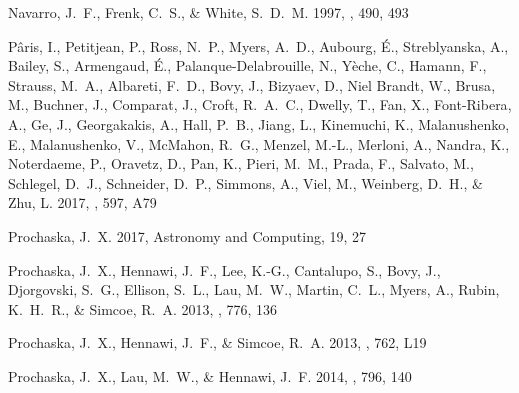 \documentclass[iop]{emulateapj}
\begin{document}
\begin{thebibliography}{61}
{Navarro}, J.~F., {Frenk}, C.~S., \& {White}, S.~D.~M. 1997, \apj, 490, 493

{P{\^a}ris}, I., {Petitjean}, P., {Ross}, N.~P., {Myers}, A.~D., {Aubourg},
  {\'E}., {Streblyanska}, A., {Bailey}, S., {Armengaud}, {\'E}.,
  {Palanque-Delabrouille}, N., {Y{\`e}che}, C., {Hamann}, F., {Strauss}, M.~A.,
  {Albareti}, F.~D., {Bovy}, J., {Bizyaev}, D., {Niel Brandt}, W., {Brusa}, M.,
  {Buchner}, J., {Comparat}, J., {Croft}, R.~A.~C., {Dwelly}, T., {Fan}, X.,
  {Font-Ribera}, A., {Ge}, J., {Georgakakis}, A., {Hall}, P.~B., {Jiang}, L.,
  {Kinemuchi}, K., {Malanushenko}, E., {Malanushenko}, V., {McMahon}, R.~G.,
  {Menzel}, M.-L., {Merloni}, A., {Nandra}, K., {Noterdaeme}, P., {Oravetz},
  D., {Pan}, K., {Pieri}, M.~M., {Prada}, F., {Salvato}, M., {Schlegel}, D.~J.,
  {Schneider}, D.~P., {Simmons}, A., {Viel}, M., {Weinberg}, D.~H., \& {Zhu},
  L. 2017, \aap, 597, A79

{Prochaska}, J.~X. 2017, Astronomy and Computing, 19, 27

{Prochaska}, J.~X., {Hennawi}, J.~F., {Lee}, K.-G., {Cantalupo}, S., {Bovy},
  J., {Djorgovski}, S.~G., {Ellison}, S.~L., {Lau}, M.~W., {Martin}, C.~L.,
  {Myers}, A., {Rubin}, K.~H.~R., \& {Simcoe}, R.~A. 2013{}, \apj,
  776, 136

{Prochaska}, J.~X., {Hennawi}, J.~F., \& {Simcoe}, R.~A. 2013{},
  \apjl, 762, L19

{Prochaska}, J.~X., {Lau}, M.~W., \& {Hennawi}, J.~F. 2014, \apj, 796, 140


\end{thebibliography}
\end{document}
